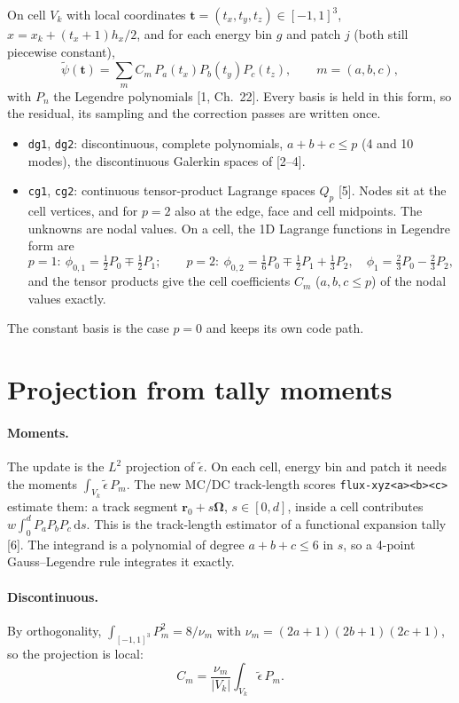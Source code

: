 \documentclass[11pt]{article}
\newcommand{\tpsi}{\tilde\psi}
\newcommand{\teps}{\tilde\epsilon}
\newcommand{\Om}{\boldsymbol\Omega}
\newcommand{\tb}{\mathbf t}
\begin{document}
On cell $V_k$ with local coordinates $\tb=(t_x,t_y,t_z)\in[-1,1]^3$,
$x = x_k + (t_x+1)h_x/2$, and for each energy bin $g$ and patch $j$ (both still
piecewise constant),
\begin{equation}
  \tpsi(\tb) = \sum_{m} C_m\, P_a(t_x)P_b(t_y)P_c(t_z),\qquad m=(a,b,c),
\end{equation}
with $P_n$ the Legendre polynomials [1, Ch.~22]. Every basis is held in this form,
so the residual, its sampling and the correction passes are written once.
\begin{itemize}
  \item \texttt{dg1}, \texttt{dg2}: discontinuous, complete polynomials,
  $a+b+c\le p$ (4 and 10 modes), the discontinuous Galerkin spaces of [2--4].
  \item \texttt{cg1}, \texttt{cg2}: continuous tensor-product Lagrange spaces $Q_p$
  [5]. Nodes sit at the cell vertices, and for $p=2$ also at the edge, face and
  cell midpoints. The unknowns are nodal values. On a cell, the 1D Lagrange functions
  in Legendre form are
  \begin{equation}
    p=1:\ \phi_{0,1} = \tfrac12 P_0 \mp \tfrac12 P_1;\qquad
    p=2:\ \phi_{0,2} = \tfrac16 P_0 \mp \tfrac12 P_1 + \tfrac13 P_2,\quad
    \phi_1 = \tfrac23 P_0 - \tfrac23 P_2,
  \end{equation}
  and the tensor products give the cell coefficients $C_m$ ($a,b,c\le p$) of the
  nodal values exactly.
\end{itemize}
The constant basis is the case $p=0$ and keeps its own code path.

\section{Projection from tally moments}

\paragraph{Moments.} The update is the $L^2$ projection of $\teps$. On each cell,
energy bin and patch it needs the moments $\int_{V_k}\teps\,P_m$. The new MC/DC
track-length scores \texttt{flux-xyz<a><b><c>} estimate them: a track segment
$\mathbf r_0+s\Om$, $s\in[0,d]$, inside a cell contributes $w\int_0^d
P_aP_bP_c\,\mathrm ds$. This is the track-length estimator of a functional expansion
tally [6]. The integrand is a polynomial of degree $a+b+c\le 6$ in $s$, so a
4-point Gauss--Legendre rule integrates it exactly.

\paragraph{Discontinuous.} By orthogonality, $\int_{[-1,1]^3}P_m^2 =
8/\nu_m$ with $\nu_m=(2a+1)(2b+1)(2c+1)$, so the projection is local:
\begin{equation}
  C_m = \frac{\nu_m}{|V_k|}\int_{V_k}\teps\,P_m .
\end{equation}
\end{document}
